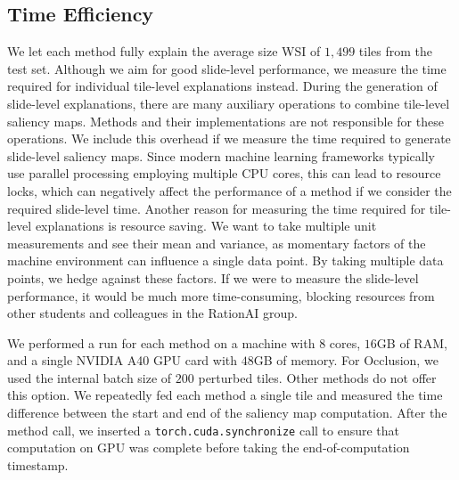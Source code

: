 \subsection*{Time Efficiency}

 We let each method fully explain the average size WSI of $1,499$ tiles from the test set.
 Although we aim for good slide-level performance, we measure the time required for individual tile-level explanations instead.
 During the generation of slide-level explanations, there are many auxiliary operations to combine tile-level saliency maps.
 Methods and their implementations are not responsible for these operations.
 We include this overhead if we measure the time required to generate slide-level saliency maps.
 Since modern machine learning frameworks typically use parallel processing employing multiple CPU cores, this can lead to resource locks, which can negatively affect the performance of a method if we consider the required slide-level time.
 Another reason for measuring the time required for tile-level explanations is resource saving.
 We want to take multiple unit measurements and see their mean and variance, as momentary factors of the machine environment can influence a single data point. 
 By taking multiple data points, we hedge against these factors.
 If we were to measure the slide-level performance, it would be much more time-consuming, blocking resources from other students and colleagues in the RationAI group.

 We performed a run for each method on a machine with $8$ cores, $16$GB of RAM, and a single NVIDIA A40 GPU card with $48$GB of memory.
 For Occlusion, we used the internal batch size of $200$ perturbed tiles.
 Other methods do not offer this option.
 We repeatedly fed each method a single tile and measured the time difference between the start and end of the saliency map computation.
 After the method call, we inserted a \texttt{torch.cuda.synchronize} call to ensure that computation on GPU was complete before taking the end-of-computation timestamp.

